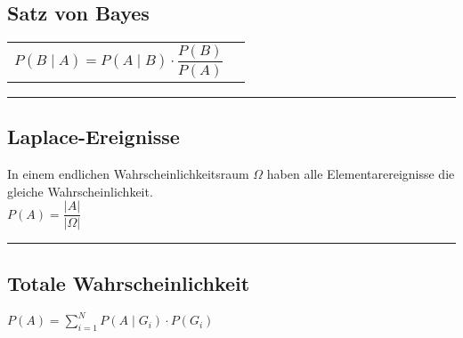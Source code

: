 \subsection{Satz von Bayes  }
\begin{tabular}{ll}
  $P(B\mid A)=P(A\mid B) \cdot\dfrac{P(B)}{P(A)}$
  \vspace{1mm}
\end{tabular}
\hrule

\subsection{Laplace-Ereignisse  }
In einem endlichen Wahrscheinlichkeitsraum $\Omega$ haben alle
Elementarereignisse die gleiche Wahrscheinlichkeit. \\
$P(A)=\dfrac{\left| A\right|}{\left|\Omega\right|}$ \\
\hrule

\subsection{Totale Wahrscheinlichkeit  }
$P(A)=\sum\limits_{i=1}^N P(A\mid G_i)\cdot P(G_i)$ 
